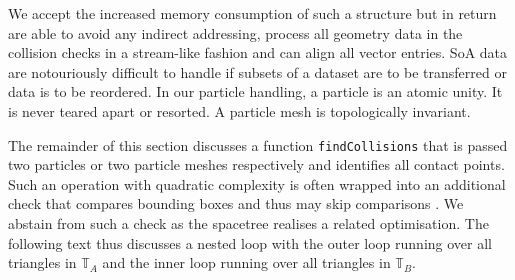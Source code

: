 We accept the increased memory consumption of such a structure but in return are
able to avoid any indirect addressing, process all geometry data in the
collision checks in a stream-like fashion and can align all vector entries. 
SoA data are notouriously difficult to handle if subsets of a dataset are to be
transferred or data is to be reordered.
In our particle handling, a particle is an atomic unity.
It is never teared apart or resorted.
A particle mesh is topologically invariant.

The remainder of this section discusses a function \texttt{findCollisions} that
is passed two particles or two particle meshes respectively and identifies all
contact points. 
Such an operation with quadratic complexity is often wrapped into an additional
check that compares bounding boxes and thus may skip comparisons
\cite{mattutis}.
We abstain from such a check as the spacetree realises a related optimisation.
The following text thus discusses a nested loop with the outer loop
running over all triangles in $\mathbb{T}_A$ and the inner loop running over all
triangles in $\mathbb{T}_B$. 




